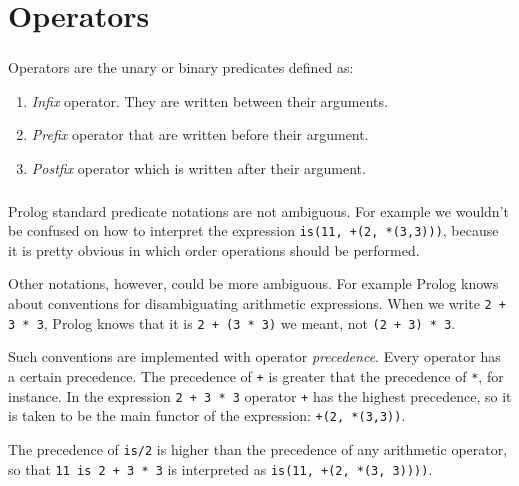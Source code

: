 \section{Operators}

\begin{frame}
	\frametitle{\insertsection}
	
	Operators are the unary or binary predicates defined as:
	
	\begin{enumerate}
		\item \textit{Infix} operator. They are written between their arguments.
		\item \textit{Prefix} operator that are written before their argument.
		\item \textit{Postfix} operator which is written after their argument.
	\end{enumerate}
\end{frame}


\begin{frame}
	\frametitle{\insertsection}
	
	Prolog standard predicate notations are not ambiguous. For example we wouldn't be confused on how to interpret the expression \texttt{is(11, +(2, *(3,3)))}, because it is pretty obvious in which order operations should be performed.
	
	Other notations, however, could be more ambiguous. For example Prolog knows about conventions for disambiguating arithmetic expressions. When we write \texttt{2 + 3 * 3}, Prolog knows that it is \texttt{2 + (3 * 3)} we meant, not \texttt{(2 + 3) * 3}.
	
	Such conventions are implemented with operator \textit{precedence}. Every operator has a certain precedence. The precedence of \texttt{+} is greater that the precedence of \texttt{*}, for instance. In the expression \texttt{2 + 3 * 3} operator \texttt{+} has the highest precedence, so it is taken to be the main functor of the expression: \texttt{+(2, *(3,3))}.
	
	The precedence of \texttt{is/2} is higher than the precedence of any arithmetic operator, so that \texttt{11 is 2 + 3 * 3} is interpreted as \texttt{is(11, +(2, *(3, 3))))}.
\end{frame}


